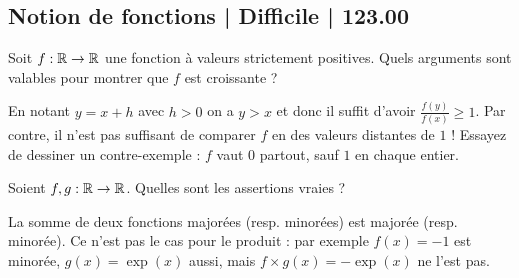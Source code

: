 \subsection{Notion de fonctions | Difficile | 123.00}


\begin{question}
Soit $f : \mathbb{R} \to \mathbb{R}$ une fonction à valeurs strictement positives. Quels arguments sont valables pour montrer que $f$ est croissante ?

\begin{answers}



   
\end{answers}
\begin{explanations}
En notant $y = x+h$ avec $h>0$ on a $y > x$ et donc il suffit d'avoir $\frac{f(y)}{f(x)} \ge 1$.
Par contre, il n'est pas suffisant de comparer $f$ en des valeurs distantes de $1$ ! Essayez de dessiner un contre-exemple : $f$ vaut $0$ partout, sauf $1$ en chaque entier.

\end{explanations}
\end{question}


\begin{question}
Soient $f,g : \mathbb{R} \to \mathbb{R}$. Quelles sont les assertions vraies ?
\begin{answers}



\end{answers}
\begin{explanations}
La somme de deux fonctions majorées (resp. minorées) est majorée (resp. minorée). Ce n'est pas le cas pour le produit : par exemple
$f(x) = -1$ est minorée, $g(x) = \exp(x)$ aussi, mais $f \times g (x) = -\exp(x)$ ne l'est pas.
\end{explanations}
\end{question}


